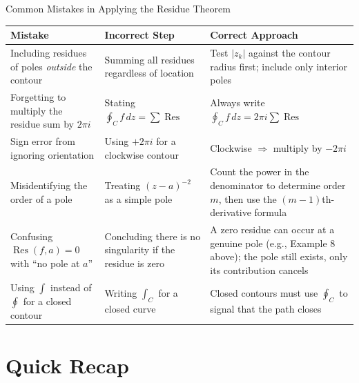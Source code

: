 \documentclass[12pt,a4paper]{article}
\begin{document}
\begin{mistakebox}{Common Mistakes in Applying the Residue Theorem}
\begin{tabular}{p{5.2cm} p{4.5cm} p{4.8cm}}
\toprule
\textbf{Mistake} & \textbf{Incorrect Step} & \textbf{Correct Approach} \\
\midrule
Including residues of poles \emph{outside} the contour &
  Summing all residues regardless of location &
  Test $|z_k|$ against the contour radius first; include only interior poles \\
\midrule
Forgetting to multiply the residue sum by $2\pi i$ &
  Stating $\oint_C f\,dz = \sum\operatorname{Res}$ &
  Always write $\oint_C f\,dz = 2\pi i \sum\operatorname{Res}$ \\
\midrule
Sign error from ignoring orientation &
  Using $+2\pi i$ for a clockwise contour &
  Clockwise $\Rightarrow$ multiply by $-2\pi i$ \\
\midrule
Misidentifying the order of a pole &
  Treating $(z-a)^{-2}$ as a simple pole &
  Count the power in the denominator to determine order $m$, then use the
  $(m-1)$th-derivative formula \\
\midrule
Confusing $\operatorname{Res}(f,a)=0$ with ``no pole at $a$'' &
  Concluding there is no singularity if the residue is zero &
  A zero residue can occur at a genuine pole (e.g., Example 8 above);
  the pole still exists, only its contribution cancels \\
\midrule
Using $\int$ instead of $\oint$ for a closed contour &
  Writing $\int_C$ for a closed curve &
  Closed contours must use $\oint_C$ to signal that the path closes \\
\bottomrule
\end{tabular}
\end{mistakebox}

\section{Quick Recap}
\end{document}
